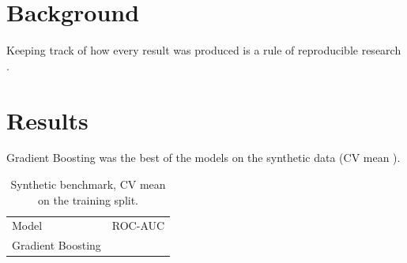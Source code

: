 \documentclass{article}
\begin{document}
\begin{abstract}
On a synthetic benchmark, Gradient Boosting reaches a 5-fold CV mean ROC-AUC of \GbAucCv{}. %
\end{abstract}

\section{Background}
Keeping track of how every result was produced is a rule of reproducible research \cite{sandve2013}. %

\section{Results}
Gradient Boosting was the best of the models on the synthetic data (CV mean \GbAucCv{}). %
\begin{table}
\caption{Synthetic benchmark, CV mean on the training split.}
\begin{tabular}{lr}
Model & ROC-AUC \\
Gradient Boosting & \GbAucCv{} \\
\end{tabular}
\end{table}


\end{document}
